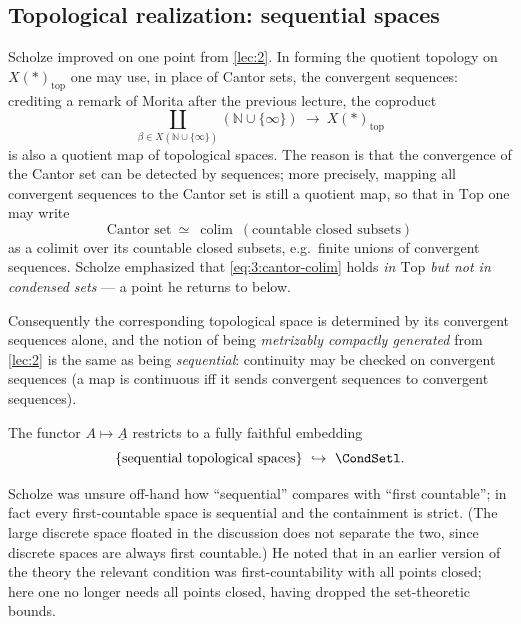 \subsection{Topological realization: sequential spaces}

Scholze improved on one point from \cref{lec:2}. In forming the quotient
topology on $X(*)_{\mathrm{top}}$ one may use, in place of Cantor sets, the
convergent sequences: crediting a remark of Morita after the previous lecture,
the coproduct
\begin{equation*}
\coprod_{\beta\in X(\mathbb{N}\cup\{\infty\})}(\mathbb{N}\cup\{\infty\})
\ \longrightarrow\ X(*)_{\mathrm{top}}
\end{equation*}
is also a quotient map of topological spaces. The reason is that the convergence
of the Cantor set can be detected by sequences; more precisely, mapping all
convergent sequences to the Cantor set is still a quotient map, so that in
$\mathrm{Top}$ one may write
\begin{equation}
\label{eq:3:cantor-colim}
\text{Cantor set}\ \simeq\ \operatorname*{colim}\ (\text{countable closed subsets})
\end{equation}
as a colimit over its countable closed subsets, e.g.\ finite unions of convergent
sequences. Scholze emphasized that \eqref{eq:3:cantor-colim} holds \emph{in
$\mathrm{Top}$ but not in condensed sets} --- a point he returns to below.

Consequently the corresponding topological space is determined by its convergent
sequences alone, and the notion of being \emph{metrizably compactly generated}
from \cref{lec:2} is the same as being \emph{sequential}: continuity may be
checked on convergent sequences (a map is continuous iff it sends convergent
sequences to convergent sequences).

\begin{proposition}
\label{prop:3:sequential-embed}
The functor $A\mapsto\underline{A}$ restricts to a fully faithful embedding
\begin{equation*}
\{\text{sequential topological spaces}\}\ \hookrightarrow\ \CondSetl.
\end{equation*}
\end{proposition}

\begin{remark}
\label{rmk:3:sequential-first-countable}
Scholze was unsure off-hand how ``sequential'' compares with ``first
countable''; in fact every first-countable space is sequential and the
containment is strict. (The large discrete space floated in the discussion does
not separate the two, since discrete spaces are always first countable.) He
noted that in an earlier version of the theory the relevant condition was
first-countability with all points closed; here one no longer needs all points
closed, having dropped the set-theoretic bounds.
\end{remark}

